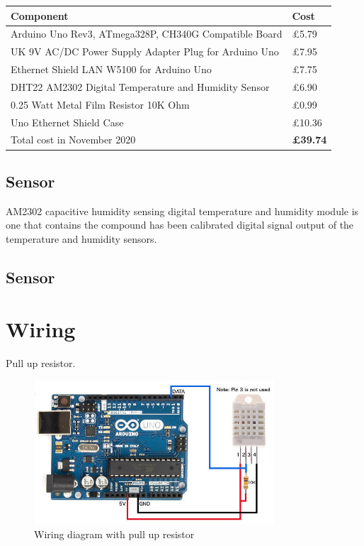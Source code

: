 \documentclass[a4paper, 12pt]{article}
\begin{document}
\begin{tabular}{ll}
  \textbf{Component} & \textbf{Cost} \\ 
  \hline
  Arduino Uno Rev3, ATmega328P, CH340G Compatible Board & \pounds 5.79 \\
  UK 9V AC/DC Power Supply Adapter Plug for Arduino Uno & \pounds 7.95 \\
  Ethernet Shield LAN W5100 for Arduino Uno & \pounds 7.75 \\
  DHT22 AM2302 Digital Temperature and Humidity Sensor & \pounds 6.90 \\
  0.25 Watt Metal Film Resistor 10K Ohm & \pounds 0.99 \\
  Uno Ethernet Shield Case & \pounds 10.36 \\
  \hline
  Total cost in November 2020 & \textbf{\pounds 39.74}  \\
\end{tabular}

\subsection{Sensor}

AM2302 capacitive humidity sensing digital temperature and humidity module is one that contains the
compound has been calibrated digital signal output of the temperature and humidity sensors. 



\subsection{Sensor}

\section{Wiring}

Pull up resistor.



\begin{figure}[H]
  \centering
  \includegraphics[width=0.8\textwidth]{wiring-dht22.jpg}
  \caption{Wiring diagram with pull up resistor}
\end{figure}
\end{document}
